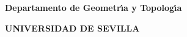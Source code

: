 \documentclass[twoside]{report}
\begin{document}
\begin{center}
{\large \bf Departamento de Geometr\'{\i}a y Topolog\'{\i}a}
\end{center}
\begin{center}
{\large \bf UNIVERSIDAD DE SEVILLA}
\end{center}

\setcounter{page}{0}

\tableofcontents













\end{document}
